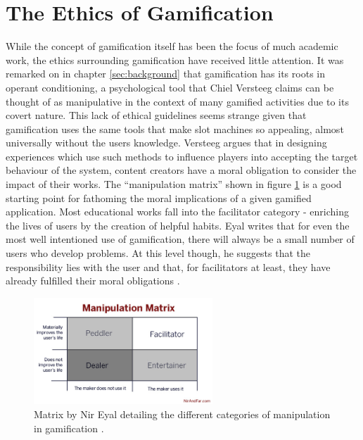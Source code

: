 \documentclass[12pt,a4paper,twoside]{report}
\begin{document}
\section{The Ethics of Gamification}
While the concept of gamification itself has been the focus of much academic work, the ethics surrounding gamification have received little attention. It was remarked on in chapter \ref{sec:background} that gamification has its roots in operant conditioning, a psychological tool that Chiel Versteeg claims \cite{versteeg2013ethics} can be thought of as manipulative in the context of many gamified activities due to its covert nature. This lack of ethical guidelines seems strange given that gamification uses the same tools that make slot machines so appealing, almost universally without the users knowledge. Versteeg argues that in designing experiences which use such methods to influence players into accepting the target behaviour of the system, content creators have a moral obligation to consider the impact of their works. The ``manipulation matrix'' shown in figure \ref{matrix} is a good starting point for fathoming the moral implications of a given gamified application. Most educational works fall into the facilitator category - enriching the lives of users by the creation of helpful habits. Eyal writes that for even the most well intentioned use of gamification, there will always be a small number of users who develop problems. At this level though, he suggests that the responsibility lies with the user and that, for facilitators at least, they have already fulfilled their moral obligations \cite{Eyal2013}.

\begin{figure}
	\begin{center}
		\includegraphics[width=0.6\textwidth]{../img/matrix.jpg}
		\caption{Matrix by Nir Eyal detailing the different categories of manipulation in gamification \cite{Eyal2013}.}
		\label{matrix}
	\end{center}
\end{figure}
\end{document}
